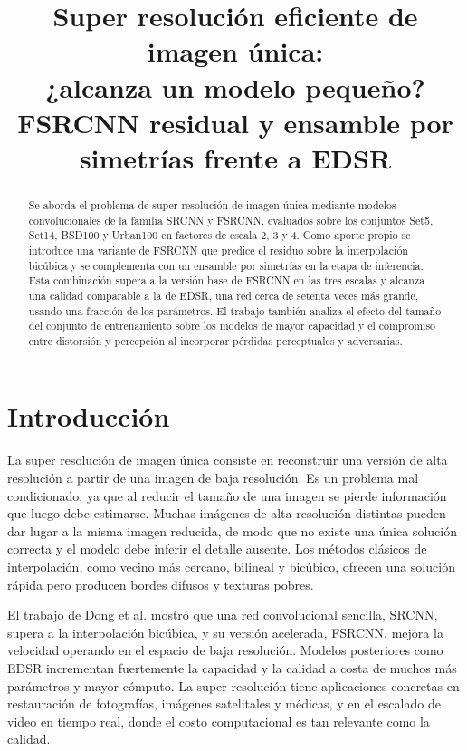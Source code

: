 \documentclass[conference]{IEEEtran}
\title{Super resolución eficiente de imagen única:\\¿alcanza un modelo pequeño? FSRCNN residual y ensamble por simetrías frente a EDSR}
\author{
\IEEEauthorblockN{Axel Fritz \quad Santiago Bunge}
\IEEEauthorblockA{Departamento de Ingeniería, Universidad de San Andrés\\
afritz@udesa.edu.ar \quad sbunge@udesa.edu.ar}
}
\begin{document}
\maketitle

\begin{abstract}
Se aborda el problema de super resolución de imagen única mediante modelos convolucionales
de la familia SRCNN y FSRCNN, evaluados sobre los conjuntos Set5, Set14, BSD100 y Urban100 en
factores de escala 2, 3 y 4. Como aporte propio se introduce una variante de FSRCNN que predice
el residuo sobre la interpolación bicúbica y se complementa con un ensamble por simetrías en la
etapa de inferencia. Esta combinación supera a la versión base de FSRCNN en las tres escalas y
alcanza una calidad comparable a la de EDSR, una red cerca de setenta veces más grande, usando
una fracción de los parámetros. El trabajo también analiza el efecto del tamaño del conjunto de
entrenamiento sobre los modelos de mayor capacidad y el compromiso entre distorsión y percepción
al incorporar pérdidas perceptuales y adversarias.
\end{abstract}

\section{Introducción}
La super resolución de imagen única consiste en reconstruir una versión de alta resolución a
partir de una imagen de baja resolución. Es un problema mal condicionado, ya que al reducir el
tamaño de una imagen se pierde información que luego debe estimarse. Muchas imágenes de alta
resolución distintas pueden dar lugar a la misma imagen reducida, de modo que no existe una única
solución correcta y el modelo debe inferir el detalle ausente. Los métodos clásicos de
interpolación, como vecino más cercano, bilineal y bicúbico, ofrecen una solución rápida pero
producen bordes difusos y texturas pobres.

El trabajo de Dong et al. mostró que una red convolucional sencilla, SRCNN, supera a la
interpolación bicúbica, y su versión acelerada, FSRCNN, mejora la velocidad operando en el
espacio de baja resolución. Modelos posteriores como EDSR incrementan fuertemente la capacidad
y la calidad a costa de muchos más parámetros y mayor cómputo. La super resolución tiene
aplicaciones concretas en restauración de fotografías, imágenes satelitales y médicas, y en el
escalado de video en tiempo real, donde el costo computacional es tan relevante como la calidad.
\end{document}
